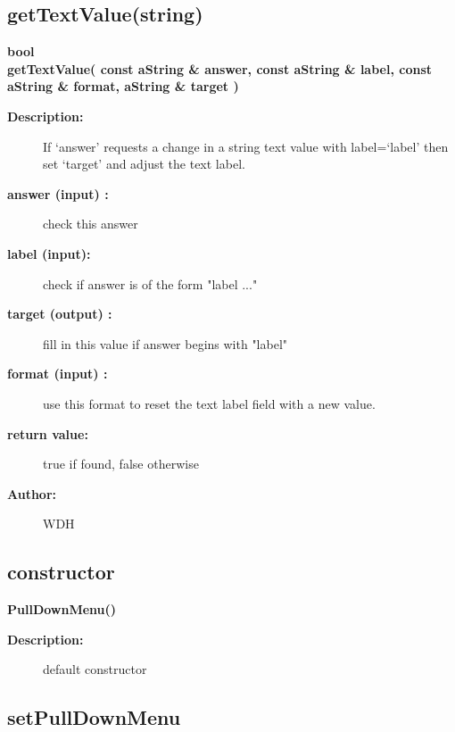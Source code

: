\subsection{getTextValue(string)}
 
\begin{flushleft} \textbf{%
bool  \\ 
\settowidth{\DialogDataIncludeArgIndent}{getTextValue(}%
getTextValue( const aString \& answer, const aString \& label, const aString \& format, aString \& target )
}\end{flushleft}
\begin{description}
\item[{\bf Description:}]  
    If `answer' requests a change in a string text value with label=`label' 
      then set `target' and adjust the
    text label.
\item[{\bf answer (input) :}]  check this answer
\item[{\bf label (input):}]  check if answer is of the form "label ..."
\item[{\bf target (output) :}]  fill in this value if answer begins with "label"
\item[{\bf format (input) :}]  use this format to reset the text label field with a new value.
\item[{\bf return value:}]  true if found, false otherwise
\item[{\bf Author:}]  WDH
\end{description}
\subsection{constructor}
 
\begin{flushleft} \textbf{%
\settowidth{\DialogDataIncludeArgIndent}{PullDownMenu(}%
PullDownMenu()
}\end{flushleft}
\begin{description}
\item[{\bf Description:}]  default constructor
\end{description}
\subsection{setPullDownMenu}
 
